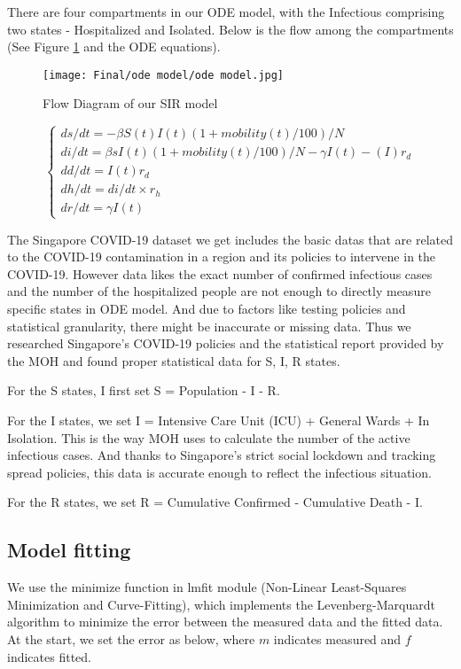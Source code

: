 There are four compartments in our ODE model, with the Infectious comprising two states - Hospitalized and Isolated. Below is the flow among the compartments (See Figure \ref{sir2} and the ODE equations).
\begin{figure}
	\centering
	\texttt{[image: Final/ode model/ode model.jpg]}
	\caption{Flow Diagram of our SIR model}
	\label{sir2}
\end{figure}
\begin{equation}
\begin{cases} ds/dt = -\beta S(t) I(t) (1 + mobility(t)/100)/N \\ di/dt = \beta s I(t) (1 + mobility(t)/100)/N - \gamma I(t) - (I) r_d\\ dd/dt = I(t) r_d \\ dh/dt = di/dt \times r_h\\ dr/dt = \gamma I(t) \end{cases}
\end{equation}

The Singapore COVID-19 dataset we get includes the basic datas that are related to the COVID-19 contamination in a region and its policies to intervene in the COVID-19. However data likes the exact number of confirmed infectious cases and the number of the hospitalized people are not enough to directly measure  specific states in ODE model. And due to factors like testing policies and statistical granularity, there might be inaccurate or missing data. Thus we researched Singapore's COVID-19 policies and the statistical report provided by the MOH and found proper statistical data for S, I, R states.

For the S states, I first set S =  Population - I - R.

For the I states, we set I  = Intensive Care Unit (ICU) + General Wards + In Isolation. This is the way MOH uses to calculate the number of the active infectious cases. And thanks to Singapore's strict social lockdown and tracking spread policies, this data is accurate enough to reflect the infectious situation.

For the R states, we set R = Cumulative Confirmed - Cumulative Death - I.



\subsection{ Model fitting}

We use the minimize function in lmfit module (Non-Linear Least-Squares Minimization and Curve-Fitting), which implements the Levenberg-Marquardt algorithm to minimize the error between the measured data and the fitted data.
At the start, we set the error as below, where $m$ indicates measured and $f$ indicates fitted.


